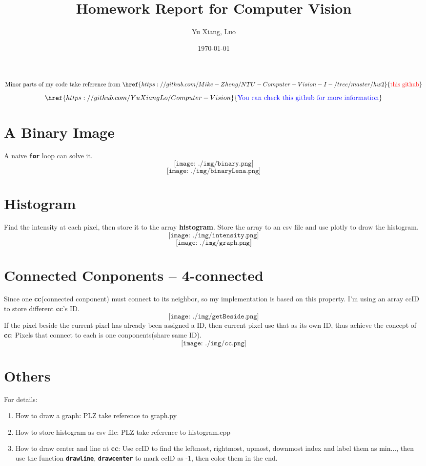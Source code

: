 \documentclass[12pt,a4paper]{article}
\title{Homework Report for Computer Vision}
\author{Yu Xiang, Luo}
\date{\today}
\begin{document}
\maketitle

\[
	\text{Minor parts of my code take reference from }\href{https://github.com/Mike-Zheng/NTU-Computer-Vision-I-/tree/master/hw2}{\text{\textcolor{red}{this github}}}
\]
\[
	\href{https://github.com/YuXiangLo/Computer-Vision}{\text{\textcolor{blue}{You can check this github for more information}}}
\]

\section*{A Binary Image}
A naive \textbf{\texttt{for}} loop can solve it.
\[
	\texttt{[image: ./img/binary.png]}
\]
\[
	\texttt{[image: ./img/binaryLena.png]}
\]

\newpage
\section*{Histogram}
Find the intensity at each pixel, then store it to the array \textbf{histogram}. Store the array to an csv file and use plotly to draw the histogram.
\[
	\texttt{[image: ./img/intensity.png]}
\]
\[
	\texttt{[image: ./img/graph.png]}
\]

\newpage
\section*{Connected Conponents – 4-connected}
Since one \textbf{cc}(connected conponent) must connect to its neighbor, so my implementation is based on this property. I'm using an array ccID to store different \textbf{cc}'s ID.
\[
	\texttt{[image: ./img/getBeside.png]}
\]
If the pixel beside the current pixel has already been assigned a ID, then current pixel use that as its own ID, thus achieve the concept of \textbf{cc}: Pixels that connect to each is one conponents(share same ID).  
\[
	\texttt{[image: ./img/cc.png]}
\]

\section*{Others}
For details:
\begin{enumerate}
	\item How to draw a graph: PLZ take reference to graph.py
	\item How to store histogram as csv file: PLZ take reference to histogram.cpp
	\item How to draw center and line at \textbf{cc}: Use ccID to find the leftmost, rightmost, upmost, downmost index and label them as min..., then use the function \textbf{\texttt{drawline}}, \textbf{\texttt{drawcenter}} to mark ccID as -1, then color them in the end. 
\end{enumerate}
\end{document}
